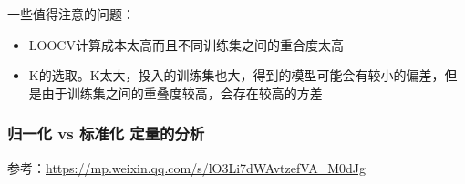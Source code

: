 一些值得注意的问题：
\begin{itemize}
	\item LOOCV计算成本太高而且不同训练集之间的重合度太高
	\item K的选取。K太大，投入的训练集也大，得到的模型可能会有较小的偏差，但是由于训练集之间的重叠度较高，会存在较高的方差
\end{itemize}


\subsubsection{归一化 vs 标准化 定量的分析}
参考：\href{https://mp.weixin.qq.com/s/lO3Li7dWAvtzefVA_M0dJg}{https://mp.weixin.qq.com/s/lO3Li7dWAvtzefVA\_M0dJg}